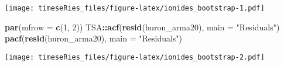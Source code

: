 \documentclass[]{book}
\newenvironment{Shaded}{\begin{snugshade}}{\end{snugshade}}
\newcommand{\KeywordTok}[1]{\textcolor[rgb]{0.13,0.29,0.53}{\textbf{#1}}}
\newcommand{\DataTypeTok}[1]{\textcolor[rgb]{0.13,0.29,0.53}{#1}}
\newcommand{\DecValTok}[1]{\textcolor[rgb]{0.00,0.00,0.81}{#1}}
\newcommand{\StringTok}[1]{\textcolor[rgb]{0.31,0.60,0.02}{#1}}
\newcommand{\OperatorTok}[1]{\textcolor[rgb]{0.81,0.36,0.00}{\textbf{#1}}}
\newcommand{\NormalTok}[1]{#1}
\begin{document}
\texttt{[image: timeseRies\_files/figure-latex/ionides\_bootstrap-1.pdf]}

\begin{Shaded}
\begin{Highlighting}[]
\KeywordTok{par}\NormalTok{(}\DataTypeTok{mfrow =} \KeywordTok{c}\NormalTok{(}\DecValTok{1}\NormalTok{, }\DecValTok{2}\NormalTok{))}
\NormalTok{TSA}\OperatorTok{::}\KeywordTok{acf}\NormalTok{(}\KeywordTok{resid}\NormalTok{(huron_arma20), }\DataTypeTok{main =} \StringTok{"Residuals"}\NormalTok{)}
\KeywordTok{pacf}\NormalTok{(}\KeywordTok{resid}\NormalTok{(huron_arma20), }\DataTypeTok{main =} \StringTok{"Residuals"}\NormalTok{)}
\end{Highlighting}
\end{Shaded}

\texttt{[image: timeseRies\_files/figure-latex/ionides\_bootstrap-2.pdf]}
\end{document}
